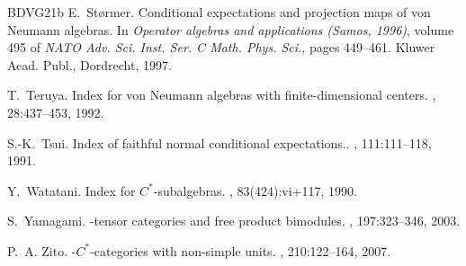 \documentclass[11pt,a4paper]{article}
\theoremstyle{plain}
\theoremstyle{definition}
\theoremstyle{remark}
\numberwithin{equation}{section}%
\begin{document}
\begin{thebibliography}{BDVG21b}
E.~St{\o}rmer.
\newblock Conditional expectations and projection maps of von {N}eumann
  algebras.
\newblock In {\em Operator algebras and applications ({S}amos, 1996)}, volume
  495 of {\em NATO Adv. Sci. Inst. Ser. C Math. Phys. Sci.}, pages 449--461.
  Kluwer Acad. Publ., Dordrecht, 1997.

T.~Teruya.
\newblock Index for von {N}eumann algebras with finite-dimensional centers.
, 28:437--453, 1992.

S.-K.~Tsui.
\newblock Index of faithful normal conditional expectations..
, 111:111--118, 1991.

Y.~Watatani.
\newblock Index for {$C^*$}-subalgebras.
, 83(424):vi+117, 1990.

S.~Yamagami.
-tensor categories and free product bimodules.
, 197:323--346, 2003.

P.~A. Zito.
-{$C^*$}-categories with non-simple units.
, 210:122--164, 2007.

\end{thebibliography}
\end{document}
